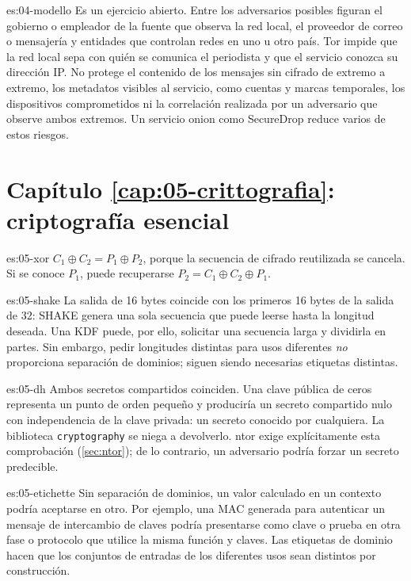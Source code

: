 \begin{soluzione}{es:04-modello}
Es un ejercicio abierto. Entre los adversarios posibles figuran el gobierno o empleador de la fuente que observa la red local, el proveedor de correo o mensajería y entidades que controlan redes en uno u otro país. Tor impide que la red local sepa con quién se comunica el periodista y que el servicio conozca su dirección IP. No protege el contenido de los mensajes sin cifrado de extremo a extremo, los metadatos visibles al servicio, como cuentas y marcas temporales, los dispositivos comprometidos ni la correlación realizada por un adversario que observe ambos extremos. Un servicio onion como SecureDrop reduce varios de estos riesgos.
\end{soluzione}

\section*{Capítulo \ref{cap:05-crittografia}: criptografía esencial}

\begin{soluzione}{es:05-xor}
$C_1 \oplus C_2 = P_1 \oplus P_2$, porque la secuencia de cifrado reutilizada se cancela. Si se conoce $P_1$, puede recuperarse $P_2=C_1\oplus C_2\oplus P_1$.
\end{soluzione}

\begin{soluzione}{es:05-shake}
La salida de 16 bytes coincide con los primeros 16 bytes de la salida de 32: SHAKE genera una sola secuencia que puede leerse hasta la longitud deseada. Una KDF puede, por ello, solicitar una secuencia larga y dividirla en partes. Sin embargo, pedir longitudes distintas para usos diferentes \emph{no} proporciona separación de dominios; siguen siendo necesarias etiquetas distintas.
\end{soluzione}

\begin{soluzione}{es:05-dh}
Ambos secretos compartidos coinciden. Una clave pública de ceros representa un punto de orden pequeño y produciría un secreto compartido nulo con independencia de la clave privada: un secreto conocido por cualquiera. La biblioteca \texttt{cryptography} se niega a devolverlo. ntor exige explícitamente esta comprobación (\cref{sec:ntor}); de lo contrario, un adversario podría forzar un secreto predecible.
\end{soluzione}

\begin{soluzione}{es:05-etichette}
Sin separación de dominios, un valor calculado en un contexto podría aceptarse en otro. Por ejemplo, una MAC generada para autenticar un mensaje de intercambio de claves podría presentarse como clave o prueba en otra fase o protocolo que utilice la misma función y claves. Las etiquetas de dominio hacen que los conjuntos de entradas de los diferentes usos sean distintos por construcción.
\end{soluzione}

